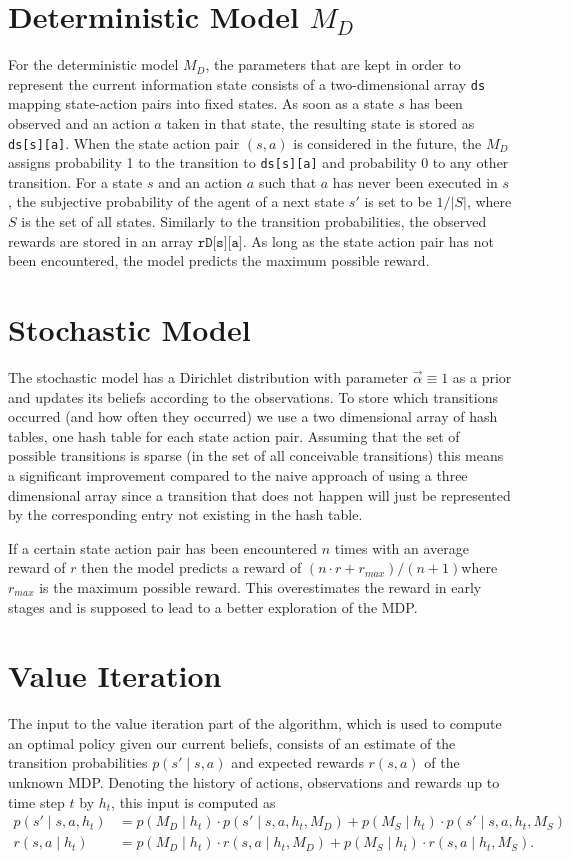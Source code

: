 \documentclass{scrartcl}
\begin{document}
\section{Deterministic Model $M_D$}
For the deterministic model $M_D$, the parameters that are kept in order to represent the current information state consists of a two-dimensional array \texttt{ds} mapping state-action pairs into fixed states. As soon as a state $s$ has been observed and an action $a$ taken in that state, the resulting state is stored as \texttt{ds[s][a]}.  When the state action pair $(s,a)$ is considered in the future, the $M_D$ assigns probability 1 to the transition to \texttt{ds[s][a]} and probability 0 to any other transition. For a state $s$ and an action $a$ such that $a$ has never been executed in $s$, the subjective probability of the agent of a next state $s'$ is set to be $1 / |S|$, where $S$ is the set of all states. Similarly to the transition probabilities, the observed rewards are stored in an array $\texttt{rD[s][a]}$. As long as the state action pair has not been encountered, the model predicts the maximum possible reward.

\section{Stochastic Model}
The stochastic model has a Dirichlet distribution with parameter $\vec{α} ≡ 1$ as a prior and updates its beliefs according to the observations. To store which transitions occurred (and how often they occurred) we use a two dimensional array of hash tables, one hash table for each state action pair. Assuming that the set of possible transitions is sparse (in the set of all conceivable transitions) this means a significant improvement compared to the naive approach of using a three dimensional array since a transition that does not happen will just be represented by the corresponding entry not existing in the hash table.

If a certain state action pair has been encountered $n$ times with an average reward of $r$ then the model predicts a reward of $(n \cdot r + r_{max})/(n+1)$where $r_{max}$ is the maximum possible reward. This overestimates the reward in early stages and is supposed to lead to a better exploration of the MDP.

\section{Value Iteration}
The input to the value iteration part of the algorithm, which is used to compute an optimal policy given our current beliefs, consists of an estimate of the transition probabilities $p(s' \mid s, a)$ and expected rewards $r(s, a)$ of the unknown MDP. Denoting the history of actions, observations and rewards up to time step $t$ by $h_t$, this input is computed as
\begin{align*}
p( s' \mid s, a, h_t ) & = p(M_D \mid h_t ) \cdot p( s' \mid s, a, h_t, M_D) + p(M_S \mid h_t ) \cdot p( s' \mid s, a, h_t, M_S) \\
r( s, a \mid h_t ) & = p(M_D \mid h_t )\cdot r(s, a \mid h_t, M_D) + p(M_S \mid h_t )\cdot r(s, a \mid h_t, M_S).
\end{align*}
\end{document}
